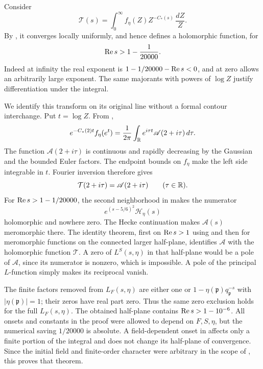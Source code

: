 Consider
\begin{equation}
 \mathcal T(s)=\int_0^\infty f_\eta(Z)Z^{-C_*(s)}\,\frac{dZ}{Z}.
\label{eq:final-Mellin-transform}
\end{equation}
By , it converges locally
uniformly, and hence defines a holomorphic function, for
\[
 \operatorname{Re} s>1-\frac1{20000}.
\]
Indeed at infinity the real exponent is
\(1-1/20000-\operatorname{Re} s<0\), and at zero
 allows an arbitrarily large exponent.
The same majorants with powers of \(\log Z\) justify differentiation
under the integral.

We identify this transform on its original line without a formal contour
interchange.  Put \(t=\log Z\).  From
,
\[
 e^{-C_*(2)t}f_\eta(e^t)
       =\frac1{2\pi}\int_{\mathbb{R}}e^{i\tau t}\mathscr A(2+i\tau)\,d\tau .
\]
The function \(\mathscr A(2+i\tau)\) is continuous and rapidly decreasing by
the Gaussian and the bounded Euler factors.  The endpoint bounds on
\(f_\eta\) make the left side integrable in \(t\).  Fourier inversion
therefore gives
\begin{equation}
 \mathcal T(2+i\tau)=\mathscr A(2+i\tau)\qquad(\tau\in\mathbb{R}).
\label{eq:Mellin-identification}
\end{equation}
For \(\operatorname{Re} s>1-1/20000\), the second neighborhood in
 makes the numerator
\[
 e^{(s-5/6)^2}\mathcal H_\eta(s)
\]
holomorphic and nowhere zero.
The Hecke continuation makes \(\mathscr A(s)\) meromorphic there.  The identity
theorem, first on \(\operatorname{Re} s>1\) using 
and then for meromorphic functions on the connected larger half-plane,
identifies \(\mathscr A\) with the holomorphic function \(\mathcal T\).
A zero of \(L^S(s,\eta)\) in that half-plane would be a pole of \(\mathscr A\),
since its numerator is nonzero, which is impossible.  A pole of the
principal \(L\)-function simply makes its reciprocal vanish.

The finite factors removed from \(L_F(s,\eta)\) are either one or
\(1-\eta(\mathfrak p)q_{\mathfrak p}^{-s}\) with
\(|\eta(\mathfrak p)|=1\); their zeros have real part zero.  Thus the
same zero exclusion holds for the full \(L_F(s,\eta)\).  The obtained
half-plane contains \(\operatorname{Re} s>1-10^{-6}\).  All onsets and constants in
the proof were allowed to depend on \(F,S,\eta\), but the numerical
saving \(1/20000\) is absolute.  A field-dependent onset in
 affects only a finite portion of the integral
and does not change its half-plane of convergence.  Since the initial
field and finite-order character were arbitrary in the scope of
, this proves that theorem.
